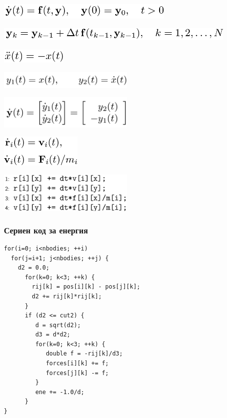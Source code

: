 \documentclass{beamer}
\begin{document}
\begin{frame}
  

  \includegraphics[width=0.65\textwidth]{ode1}  

  \includegraphics[width=0.89\textwidth]{ode2}  \pause

  \includegraphics[width=0.24\textwidth]{ode3}

  \includegraphics[width=0.5\textwidth]{ode4}
  
  \includegraphics[width=0.5\textwidth]{ode5}
\end{frame}

\begin{frame}
  \includegraphics[width=0.3\textwidth]{ode6}

  \includegraphics[width=0.5\textwidth]{pseudo-code2}
\end{frame}

\begin{frame}
  \frametitle{Сериен код за енергия}
\begin{verbatim}
for(i=0; i<nbodies; ++i)
  for(j=i+1; j<nbodies; ++j) {
    d2 = 0.0;
      for(k=0; k<3; ++k) {
        rij[k] = pos[i][k] - pos[j][k];
        d2 += rij[k]*rij[k];
      }
      if (d2 <= cut2) {
         d = sqrt(d2);
         d3 = d*d2;
         for(k=0; k<3; ++k) {
            double f = -rij[k]/d3;
      	    forces[i][k] += f;
            forces[j][k] -= f;
         }
         ene += -1.0/d; 
      }
}
\end{verbatim}

\end{frame}
\end{document}
